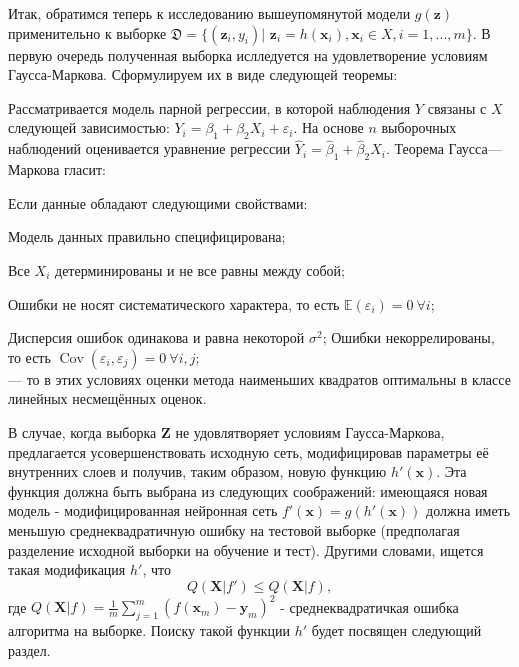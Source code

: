 \documentclass[12pt,twoside]{article}
\begin{document}
Итак, обратимся теперь к исследованию вышеупомянутой модели $g(\mathbf{z})$ применительно к выборке $\mathfrak{D} = \{(\mathbf{z}_i, y_i)|$ $ \mathbf{z}_i = h(\mathbf{x}_i), \mathbf{x}_i \in X, i = 1,...,m\}$. В первую очередь полученная выборка ислледуется на удовлетворение условиям Гаусса-Маркова. Сформулируем их в виде следующей теоремы: \par
\begin{Theorem}
Рассматривается модель парной регрессии, в которой наблюдения $Y$ связаны с $X$ следующей зависимостью: $Y_i = \beta_1 + \beta_2 X_i + \varepsilon_i$. На основе $n$ выборочных наблюдений оценивается уравнение регрессии $\hat Y_i = \hat\beta_1 + \hat\beta_2 X_i$. Теорема Гаусса—Маркова гласит:

Если данные обладают следующими свойствами:

Модель данных правильно специфицирована; \par
Все $X_{i}$ детерминированы и не все равны между собой; \par
Ошибки не носят систематического характера, то есть $\mathbb{E}(\varepsilon_i) = 0\ \forall i$; \par
Дисперсия ошибок одинакова и равна некоторой $\sigma ^{2}$;
Ошибки некоррелированы, то есть $\mathop{\mathrm{Cov}}(\varepsilon_i,\varepsilon_j)=0\ \forall i,j;$ \\
— то в этих условиях оценки метода наименьших квадратов оптимальны в классе линейных несмещённых оценок.
\end{Theorem}
\par
В случае, когда выборка $\mathbf{Z}$ не удовлятворяет условиям Гаусса-Маркова, предлагается усовершенствовать исходную сеть, модифицировав параметры её внутренних слоев и получив, таким образом, новую функцию $h'(\mathbf{x})$. Эта функция должна быть выбрана из следующих соображений: имеющаяся новая модель - модифицированная нейронная сеть $f'(\mathbf{x}) = g(h'(\mathbf{x}))$ должна иметь меньшую среднеквадратичную ошибку на тестовой выборке (предполагая разделение исходной выборки на обучение и тест). Другими словами, ищется такая модификация $h'$, что $$Q(\mathbf{X}|f') \leq Q(\mathbf{X}|f),$$ где $Q(\mathbf{X}|f) = \frac{1}{m}\sum_{j=1}^m(f(\mathbf{x}_m) - \mathbf{y}_m)^2$ - среднеквадратичкая ошибка алгоритма на выборке. Поиску такой функции $h'$ будет посвящен следующий раздел.
\end{document}
